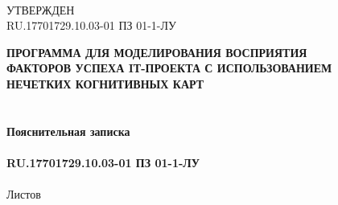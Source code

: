 \documentclass{article}
\begin{document}
    \newpage
    \clearpage
    \begin{textbf}\\
    УТВЕРЖДЕН\\
    RU.17701729.10.03-01 ПЗ 01-1-ЛУ\\
    \end{textbf}
    \bigskip
    \begin{center}
        \topskip=0pt
        \vspace*{\fill}
        \textbf{ПРОГРАММА ДЛЯ МОДЕЛИРОВАНИЯ ВОСПРИЯТИЯ\\
        ФАКТОРОВ УСПЕХА IТ-ПРОЕКТА С ИСПОЛЬЗОВАНИЕМ\\
        НЕЧЕТКИХ КОГНИТИВНЫХ КАРТ\\
        ~\\
        ~\\
        Пояснительная записка\\
        ~\\
        RU.17701729.10.03-01 ПЗ 01-1-ЛУ}\\
        ~\\
        Листов \ztotpages\\
        \vspace*{\fill}
    \end{center}
    \begin{center}
    \end{center}
    \newpage
    \tableofcontents
    \newpage
\end{document}
